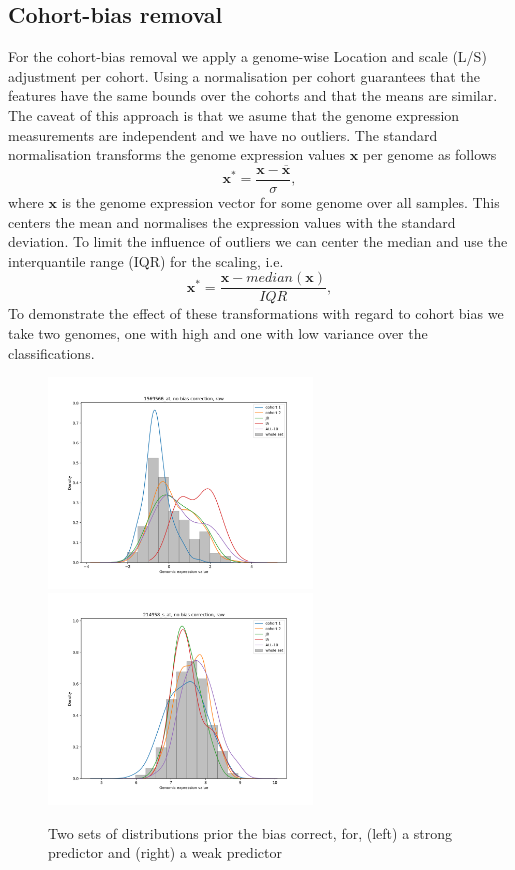\documentclass[a4paper,10pt]{article}
\begin{document}
\subsection{Cohort-bias removal}
%
For the cohort-bias removal we apply a genome-wise Location and scale (L/S) adjustment per cohort.
Using a normalisation per cohort guarantees that the features have the same bounds 
over the cohorts and that the means are similar. The caveat of this approach is that we asume 
that the genome expression measurements are independent and we have no outliers.
%
The standard normalisation transforms the genome expression values $\mathbf{x}$ per genome as follows
\begin{equation}
  \mathbf{x}^* = \frac{\mathbf{x} - \overline{\mathbf{x}}}{\sigma},
\end{equation}
%
where $\mathbf{x}$ is the genome expression vector for some genome over all samples. 
This centers the mean and normalises the  expression values with the standard deviation. 
To limit the influence of outliers we can center the median and use the interquantile range (IQR)
for the scaling, i.e.
%
\begin{equation}
  \mathbf{x}^* = \frac{\mathbf{x} - median\left({\mathbf{x}}\right)}{IQR},
\end{equation}
%
%
To demonstrate the effect of these transformations with regard to cohort bias we take two genomes, one with high and one with low variance
over the classifications.
%
\begin{figure}[htp!]
\centering
\includegraphics[width=7cm]{images/strong_genome_distribution_noCorrection_noNormalisation}
\includegraphics[width=7cm]{images/weak_genome_distribution_noCorrection_noNormalisation}
\caption{Two sets of distributions prior the bias correct, for, (left) a strong predictor and (right) a weak predictor}
\label{fig:expression_distribution_cohorts}
\end{figure}
\end{document}
